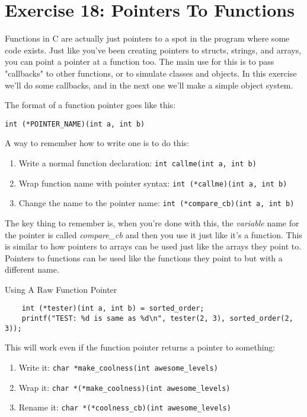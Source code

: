 \chapter{Exercise 18: Pointers To Functions}

Functions in C are actually just pointers to a spot in the
program where some code exists.  Just like you've been creating
pointers to structs, strings, and arrays, you can point a
pointer at a function too.  The main use for this is to pass
"callbacks" to other functions, or to simulate classes and
objects.  In this exercise we'll do some callbacks, and in
the next one we'll make a simple object system.

The format of a function pointer goes like this:

\verb|int (*POINTER_NAME)(int a, int b)|

A way to remember how to write one is to do this:

\begin{enumerate}
\item Write a normal function declaration: \verb|int callme(int a, int b)|
\item Wrap function name with pointer syntax: \verb|int (*callme)(int a, int b)|
\item Change the name to the pointer name: \verb|int (*compare_cb)(int a, int b)|
\end{enumerate}

The key thing to remember is, when you're done with this, the \emph{variable}
name for the pointer is called \emph{compare\_cb} and then you use it
just like it's a function.  This is similar to how pointers to arrays can
be used just like the arrays they point to.  Pointers to functions can be
used like the functions they point to but with a different name.

\begin{code}{Using A Raw Function Pointer}
\begin{lstlisting}
    int (*tester)(int a, int b) = sorted_order;
    printf("TEST: %d is same as %d\n", tester(2, 3), sorted_order(2, 3)); 
\end{lstlisting}
\end{code}

This will work even if the function pointer returns a pointer to something:

\begin{enumerate}
\item Write it: \verb|char *make_coolness(int awesome_levels)|
\item Wrap it: \verb|char *(*make_coolness)(int awesome_levels)|
\item Rename it: \verb|char *(*coolness_cb)(int awesome_levels)|
\end{enumerate}

